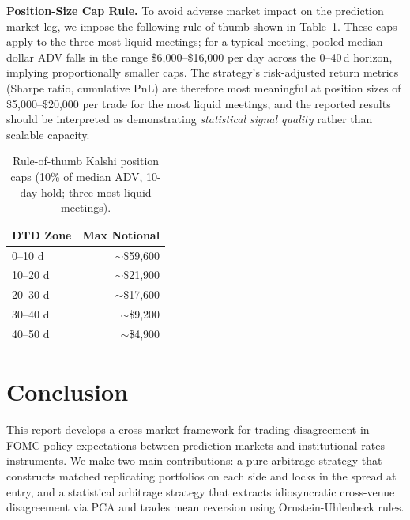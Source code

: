 \textbf{Position-Size Cap Rule.}
To avoid adverse market impact on the prediction market leg, we impose the following
rule of thumb shown in Table~\ref{tab:kalshi-caps}. These caps apply to the
three most liquid meetings; for a typical meeting, pooled-median dollar ADV
falls in the range \$6,000--\$16,000 per day across the 0--40\,d horizon,
implying proportionally smaller caps. The strategy's risk-adjusted return
metrics (Sharpe ratio, cumulative PnL) are therefore most meaningful at
position sizes of \$5,000--\$20,000 per trade for the most liquid meetings,
and the reported results should be interpreted as demonstrating
\emph{statistical signal quality} rather than scalable capacity.

\begin{table}[h]
    \centering
    \caption{Rule-of-thumb Kalshi position caps (10\% of median ADV,
             10-day hold; three most liquid meetings).}
    \label{tab:kalshi-caps}
    \begin{tabular}{lr}
        \toprule
        \textbf{DTD Zone} & \textbf{Max Notional} \\
        \midrule
         0--10 d & $\sim$\$59,600 \\
        10--20 d & $\sim$\$21,900 \\
        20--30 d & $\sim$\$17,600 \\
        30--40 d & $\sim$\$9,200  \\
        40--50 d & $\sim$\$4,900  \\
        \bottomrule
    \end{tabular}
\end{table}



\section{Conclusion}

This report develops a cross-market framework for trading disagreement in FOMC policy expectations between prediction markets and institutional rates instruments. We make two main contributions: a pure arbitrage strategy that constructs matched replicating portfolios on each side and locks in the spread at entry, and a statistical arbitrage strategy that extracts idiosyncratic cross-venue disagreement via PCA and trades mean reversion using Ornstein-Uhlenbeck rules.

